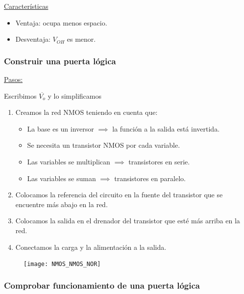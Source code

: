 \documentclass[10pt,a4paper]{article}
\begin{document}
	\underline{Características}
	
	\begin{itemize}
		\item Ventaja: ocupa menos espacio.
		\item Desventaja: $V_{OH}$ es menor.
	\end{itemize}
	
	\subsubsection{Construir una puerta lógica}
	\underline{Pasos:} \newline
	
	Escribimos $\overline{V_o}$ y lo simplificamos
	
	\begin{enumerate}
		\item Creamos la red NMOS teniendo en cuenta que:
		\begin{itemize}
			\item La base es un inversor $\implies $ la función a la salida está invertida.
			\item Se necesita un transistor NMOS por cada variable.
			\item Las variables se multiplican $\implies$ transistores en serie.
			\item Las variables se suman $\implies$ transistores en paralelo.
		\end{itemize}
		\item Colocamos la referencia del circuito en la fuente del transistor que se encuentre más abajo en la red.
		\item Colocamos la salida en el drenador del transistor que esté más arriba en la red.
		\item Conectamos la carga y la alimentación a la salida.
	\end{enumerate}

	\begin{figure}[h]
		\centering
		\texttt{[image: NMOS\_NMOS\_NOR]}
	\end{figure}

	\subsubsection{Comprobar funcionamiento de una puerta lógica}
	
\end{document}
